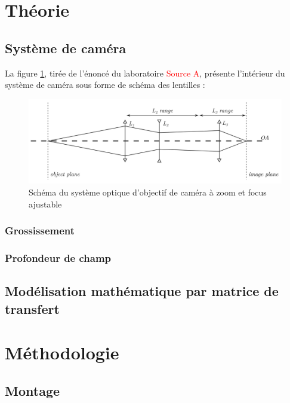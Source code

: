 \documentclass[11pt,letterpaper]{article}
\begin{document}
\section{Théorie}

\subsection{Système de caméra}

La figure \ref{schema_syst}, tirée de l'énoncé du laboratoire \textcolor{red}{Source A}, présente
l'intérieur du système de caméra sous forme de schéma des lentilles :

\begin{figure}[H]
  \centering
  \includegraphics[scale=0.1]{systeme_optique.png}
  \caption{Schéma du système optique d'objectif de caméra à zoom et focus ajustable}
  \label{schema_syst}
\end{figure}


\subsubsection{Grossissement}

\subsubsection{Profondeur de champ}

\subsection{Modélisation mathématique par matrice de transfert}

\section{Méthodologie}

\subsection{Montage}
\end{document}
